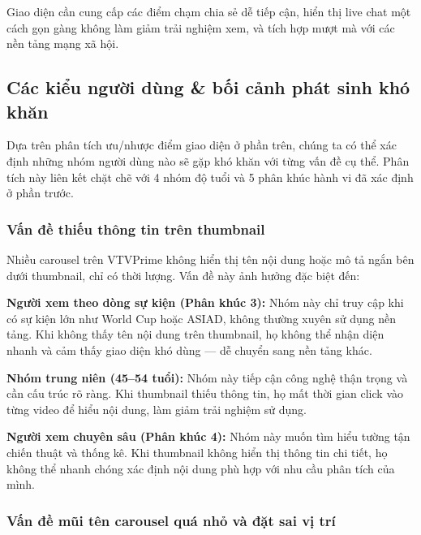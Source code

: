 Giao diện cần cung cấp các điểm chạm chia sẻ dễ tiếp cận, hiển thị live chat một cách gọn gàng không làm giảm trải nghiệm xem, và tích hợp mượt mà với các nền tảng mạng xã hội.




\subsection{Các kiểu người dùng \& bối cảnh phát sinh khó khăn}

Dựa trên phân tích ưu/nhược điểm giao diện ở phần trên, chúng ta có thể xác định những nhóm người dùng nào sẽ gặp khó khăn với từng vấn đề cụ thể. Phân tích này liên kết chặt chẽ với 4 nhóm độ tuổi và 5 phân khúc hành vi đã xác định ở phần trước.

\subsubsection{Vấn đề thiếu thông tin trên thumbnail}

Nhiều carousel trên VTVPrime không hiển thị tên nội dung hoặc mô tả ngắn bên dưới thumbnail, chỉ có thời lượng. Vấn đề này ảnh hưởng đặc biệt đến:

\textbf{Người xem theo dòng sự kiện (Phân khúc 3):} Nhóm này chỉ truy cập khi có sự kiện lớn như World Cup hoặc ASIAD, không thường xuyên sử dụng nền tảng. Khi không thấy tên nội dung trên thumbnail, họ không thể nhận diện nhanh và cảm thấy giao diện khó dùng --- dễ chuyển sang nền tảng khác.

\textbf{Nhóm trung niên (45--54 tuổi):} Nhóm này tiếp cận công nghệ thận trọng và cần cấu trúc rõ ràng. Khi thumbnail thiếu thông tin, họ mất thời gian click vào từng video để hiểu nội dung, làm giảm trải nghiệm sử dụng.

\textbf{Người xem chuyên sâu (Phân khúc 4):} Nhóm này muốn tìm hiểu tường tận chiến thuật và thống kê. Khi thumbnail không hiển thị thông tin chi tiết, họ không thể nhanh chóng xác định nội dung phù hợp với nhu cầu phân tích của mình.

\subsubsection{Vấn đề mũi tên carousel quá nhỏ và đặt sai vị trí}

